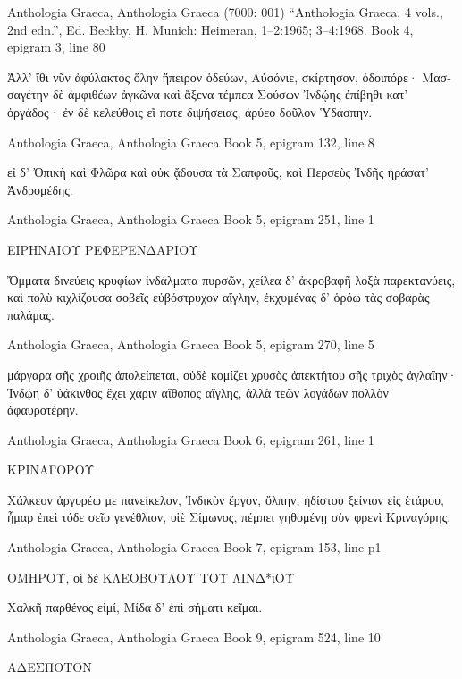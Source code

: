 \documentclass[12pt,letterpaper,twoside,final]{memoir}
\begin{document}
\begin{greek}

Anthologia Graeca, Anthologia Graeca (7000: 001)
“Anthologia Graeca, 4 vols., 2nd edn.”, Ed. Beckby, H.
Munich: Heimeran, 1–2:1965; 3–4:1968.
Book 4, epigram 3, line 80

Ἀλλ' ἴθι νῦν ἀφύλακτος ὅλην ἤπειρον ὁδεύων, 
Αὐσόνιε, σκίρτησον, ὁδοιπόρε· Μασσαγέτην δὲ 
ἀμφιθέων ἀγκῶνα καὶ ἄξενα τέμπεα Σούσων 
Ἰνδῴης ἐπίβηθι κατ' ὀργάδος· ἐν δὲ κελεύθοις 
εἴ ποτε διψήσειας, ἀρύεο δοῦλον Ὑδάσπην. 



Anthologia Graeca, Anthologia Graeca 
Book 5, epigram 132, line 8

εἰ δ' Ὀπικὴ καὶ Φλῶρα καὶ οὐκ ᾄδουσα τὰ Σαπφοῦς, 
 καὶ Περσεὺς Ἰνδῆς ἠράσατ' Ἀνδρομέδης. 



Anthologia Graeca, Anthologia Graeca 
Book 5, epigram 251, line 1

ΕΙΡΗΝΑΙΟΥ ΡΕΦΕΡΕΝΔΑΡΙΟΥ


Ὄμματα δινεύεις κρυφίων ἰνδάλματα πυρσῶν, 
 χείλεα δ' ἀκροβαφῆ λοξὰ παρεκτανύεις, 
καὶ πολὺ κιχλίζουσα σοβεῖς εὐβόστρυχον αἴγλην, 
 ἐκχυμένας δ' ὁρόω τὰς σοβαρὰς παλάμας. 



Anthologia Graeca, Anthologia Graeca 
Book 5, epigram 270, line 5

μάργαρα σῆς χροιῆς ἀπολείπεται, οὐδὲ κομίζει 
 χρυσὸς ἀπεκτήτου σῆς τριχὸς ἀγλαΐην· 
Ἰνδῴη δ' ὑάκινθος ἔχει χάριν αἴθοπος αἴγλης, 
 ἀλλὰ τεῶν λογάδων πολλὸν ἀφαυροτέρην. 



Anthologia Graeca, Anthologia Graeca 
Book 6, epigram 261, line 1

ΚΡΙΝΑΓΟΡΟΥ


Χάλκεον ἀργυρέῳ με πανείκελον, Ἰνδικὸν ἔργον, 
 ὄλπην, ἡδίστου ξείνιον εἰς ἑτάρου, 
ἦμαρ ἐπεὶ τόδε σεῖο γενέθλιον, υἱὲ Σίμωνος, 
 πέμπει γηθομένῃ σὺν φρενὶ Κριναγόρης. 



Anthologia Graeca, Anthologia Graeca 
Book 7, epigram 153, line p1

ΟΜΗΡΟΥ, οἱ δὲ ΚΛΕΟΒΟΥΛΟΥ ΤΟΥ ΛΙΝΔ*ιΟΥ


Χαλκῆ παρθένος εἰμί, Μίδα δ' ἐπὶ σήματι κεῖμαι. 



Anthologia Graeca, Anthologia Graeca 
Book 9, epigram 524, line 10

ΑΔΕΣΠΟΤΟΝ



\end{greek}
\end{document}

